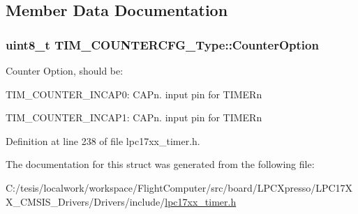 \subsection{\-Member \-Data \-Documentation}
\hypertarget{struct_t_i_m___c_o_u_n_t_e_r_c_f_g___type_a1d50721be74d896d737f1452506fd14b}{
\subsubsection[{\-Counter\-Option}]{\setlength{\rightskip}{0pt plus 5cm}uint8\-\_\-t {\bf \-T\-I\-M\-\_\-\-C\-O\-U\-N\-T\-E\-R\-C\-F\-G\-\_\-\-Type\-::\-Counter\-Option}}}\label{struct_t_i_m___c_o_u_n_t_e_r_c_f_g___type_a1d50721be74d896d737f1452506fd14b}
\-Counter \-Option, should be\-:
\begin{DoxyItemize}
\item \-T\-I\-M\-\_\-\-C\-O\-U\-N\-T\-E\-R\-\_\-\-I\-N\-C\-A\-P0\-: \-C\-A\-Pn. input pin for \-T\-I\-M\-E\-Rn
\item \-T\-I\-M\-\_\-\-C\-O\-U\-N\-T\-E\-R\-\_\-\-I\-N\-C\-A\-P1\-: \-C\-A\-Pn. input pin for \-T\-I\-M\-E\-Rn 
\end{DoxyItemize}

\-Definition at line 238 of file lpc17xx\-\_\-timer.\-h.



\-The documentation for this struct was generated from the following file\-:\begin{DoxyCompactItemize}
\item 
\-C\-:/tesis/localwork/workspace/\-Flight\-Computer/src/board/\-L\-P\-C\-Xpresso/\-L\-P\-C17\-X\-X\-\_\-\-C\-M\-S\-I\-S\-\_\-\-Drivers/\-Drivers/include/\hyperlink{lpc17xx__timer_8h}{lpc17xx\-\_\-timer.\-h}\end{DoxyCompactItemize}
